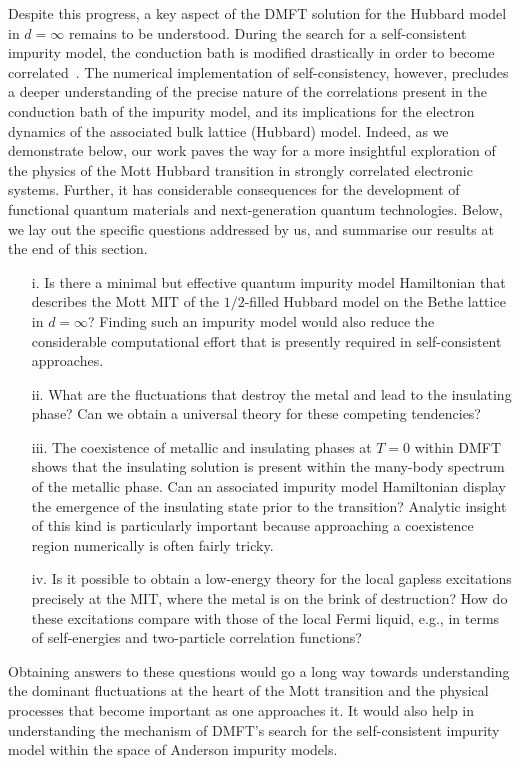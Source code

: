 \documentclass{iopart}
\begin{document}
Despite this progress, a key aspect of the DMFT solution for the Hubbard model in $d=\infty$ remains to be understood. During the search for a self-consistent impurity model, the conduction bath is modified drastically in order to become correlated~\cite{held2008}. The numerical implementation of self-consistency, however, precludes a deeper understanding of the precise nature of the correlations present in the conduction bath of the impurity model, and its implications for the electron dynamics of the associated bulk lattice (Hubbard) model. Indeed, as we demonstrate below, our work paves the way for a more insightful exploration of the physics of the Mott Hubbard transition in strongly correlated electronic systems. Further, it has considerable consequences for the development of functional quantum materials and next-generation quantum technologies. Below, we lay out the specific questions addressed by us, and summarise our results at the end of this section.
\begin{itemize}
	\item[i.] Is there a minimal but effective quantum impurity model Hamiltonian that describes the Mott MIT of the $1/2$-filled Hubbard model on the Bethe lattice in \(d=\infty\)? Finding such an impurity model would also reduce the considerable computational effort that is presently required in self-consistent approaches.
	\item[ii.] What are the fluctuations that destroy the metal and lead to the insulating phase? Can we obtain a universal theory for these competing tendencies?
	\item[iii.] The coexistence of metallic and insulating phases at $T=0$ within DMFT shows that the insulating solution is present within the many-body spectrum of the metallic phase. Can an associated impurity model Hamiltonian display the emergence of the insulating state prior to the transition? Analytic insight of this kind is particularly important because approaching a coexistence region numerically is often fairly tricky.
	\item[iv.] Is it possible to obtain a low-energy theory for the local gapless excitations precisely at the MIT, where the metal is on the brink of destruction? How do these excitations compare with those of the local Fermi liquid, e.g., in terms of self-energies and two-particle correlation functions?
\end{itemize}
Obtaining answers to these questions would go a long way towards understanding the dominant fluctuations at the heart of the Mott transition and the physical processes that become important as one approaches it. It would also help in understanding the mechanism of DMFT's search for the self-consistent impurity model within the space of Anderson impurity models.
\end{document}
